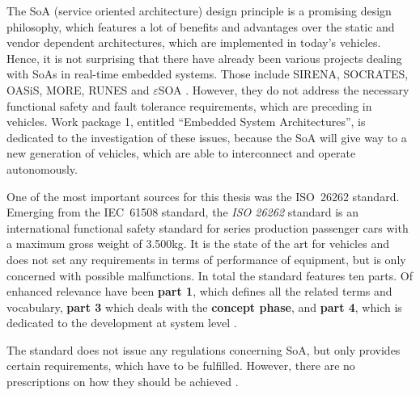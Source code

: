 \label{ch:introduction}
The SoA (service oriented architecture) design principle is a promising design philosophy, which features a lot of benefits and advantages over the static and vendor dependent architectures, which are implemented in today's vehicles. Hence, it is not surprising that there have already been various projects dealing with SoAs in real-time embedded systems. Those include SIRENA, SOCRATES, OASiS, MORE, RUNES and $\varepsilon$SOA \cite{scholz} \cite{sommer} \cite{buckl}. However, they do not address the necessary functional safety and fault tolerance requirements, which are preceding in vehicles. Work package 1, entitled ``Embedded System Architectures'', is dedicated to the investigation of these issues, because the SoA will give way to a new generation of vehicles, which are able to interconnect and operate autonomously.

One of the most important sources for this thesis was the \mbox{ISO 26262} standard. Emerging from the \mbox{IEC 61508} standard, the \emph{ISO 26262} standard is an international functional safety standard for series production passenger cars with a maximum gross weight of 3.500kg. It is the state of the art for vehicles and does not set any requirements in terms of performance of equipment, but is only concerned with possible malfunctions. In total the standard features ten parts. Of enhanced relevance have been \textbf{part 1}, which defines all the related terms and vocabulary, \textbf{part 3} which deals with the \textbf{concept phase}, and \textbf{part 4}, which is dedicated  to the development at system level \cite{iso26262:1} \cite{iso26262:3} \cite{iso26262:4}.

The standard does not issue any regulations concerning SoA, but only provides certain requirements, which have to be fulfilled. However, there are no prescriptions on how they should be achieved \cite{iso26262:course1}.

